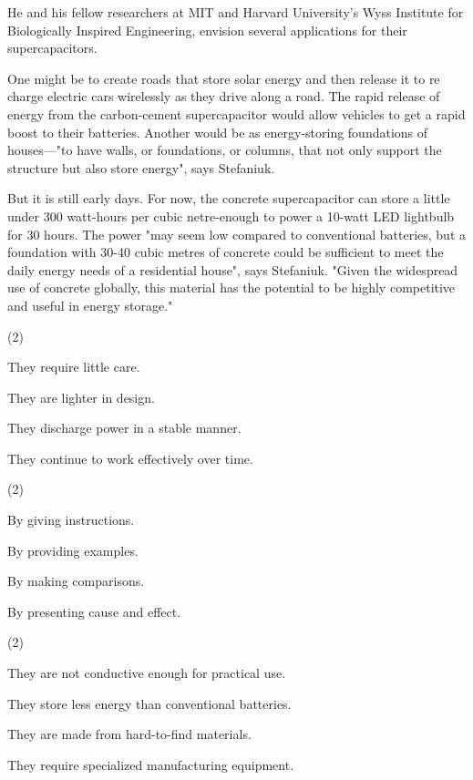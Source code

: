 \documentclass{英语试卷}
\begin{document}
\par He and his fellow researchers at MIT and Harvard University's Wyss Institute for Biologically Inspired Engineering, envision several applications for their supercapacitors.\par
\par One might be to create roads that store solar energy and then release it to re charge electric cars wirelessly as they drive along a road. The rapid release of energy from the carbon-cement supercapacitor would allow vehicles to get a rapid boost to their batteries. Another would be as energy-storing foundations of houses—"to have walls, or foundations, or columns, that not only support the structure but also store energy", says Stefaniuk.\par
\par But it is still early days. For now, the concrete supercapacitor can store a little under 300 watt-hours per cubic netre-enough to power a 10-watt LED lightbulb for 30 hours. The power "may seem low compared to conventional batteries, but a foundation with 30-40 cubic metres of concrete could be sufficient to meet the daily energy needs of a residential house", says Stefaniuk. "Given the widespread use of concrete globally, this material has the potential to be highly competitive and useful in energy storage."\par
{}
\begin{choices}(2)
  \item They require little care.
  \item They are lighter in design.
  \item They discharge power in a stable manner.
  \item They continue to work effectively over time.
\end{choices}
\begin{choices}(2)
  \item By giving instructions.
  \item By providing examples.
  \item By making comparisons.
  \item By presenting cause and effect.
\end{choices}
\begin{choices}(2)
  \item They are not conductive enough for practical use.
  \item They store less energy than conventional batteries.
  \item They are made from hard-to-find materials.
  \item They require specialized manufacturing equipment.
\end{choices}
\end{document}
